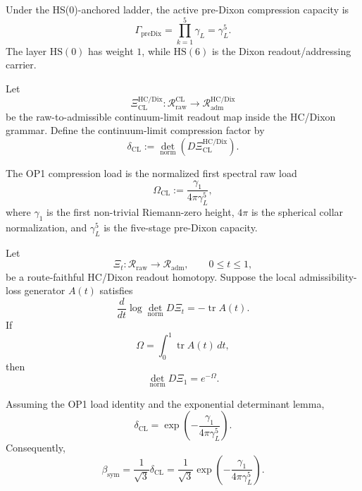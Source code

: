 \begin{lemma}
Under the HS(0)-anchored ladder, the active pre-Dixon compression capacity is
\[
  \Gamma_{\mathrm{preDix}}
  =
  \prod_{k=1}^{5}\gamma_L
  =
  \gamma_L^5.
\]
The layer \(\mathrm{HS}(0)\) has weight \(1\), while \(\mathrm{HS}(6)\) is the Dixon readout/addressing carrier.
\end{lemma}

\begin{definition}
Let
\[
  \Xi_{\mathrm{CL}}^{\mathrm{HC/Dix}}
  :
  \mathcal R_{\mathrm{raw}}^{\mathrm{CL}}
  \longrightarrow
  \mathcal R_{\mathrm{adm}}^{\mathrm{HC/Dix}}
\]
be the raw-to-admissible continuum-limit readout map inside the HC/Dixon grammar.  Define the continuum-limit compression factor by
\[
  \delta_{\mathrm{CL}}
  :=
  \det_{\mathrm{norm}}
  \left(
    D\Xi_{\mathrm{CL}}^{\mathrm{HC/Dix}}
  \right).
\]
\end{definition}

\begin{definition}
The OP1 compression load is the normalized first spectral raw load
\[
  \Omega_{\mathrm{CL}}
  :=
  \frac{\gamma_1}{4\pi\gamma_L^5},
\]
where \(\gamma_1\) is the first non-trivial Riemann-zero height, \(4\pi\) is the spherical collar normalization, and \(\gamma_L^5\) is the five-stage pre-Dixon capacity.
\end{definition}

\begin{lemma}
Let
\[
  \Xi_t:\mathcal R_{\mathrm{raw}}\to \mathcal R_{\mathrm{adm}},
  \qquad 0\le t\le 1,
\]
be a route-faithful HC/Dixon readout homotopy.  Suppose the local admissibility-loss generator \(A(t)\) satisfies
\[
  \frac{d}{dt}
  \log
  \det_{\mathrm{norm}}D\Xi_t
  =
  -\operatorname{tr}A(t).
\]
If
\[
  \Omega
  =
  \int_0^1 \operatorname{tr}A(t)\,dt,
\]
then
\[
  \det_{\mathrm{norm}}D\Xi_1
  =
  e^{-\Omega}.
\]
\end{lemma}

\begin{corollary}
Assuming the OP1 load identity and the exponential determinant lemma,
\[
  \delta_{\mathrm{CL}}
  =
  \exp\left(
    -\frac{\gamma_1}{4\pi\gamma_L^5}
  \right).
\]
Consequently,
\[
  \beta_{\mathrm{sym}}
  =
  \frac{1}{\sqrt3}\delta_{\mathrm{CL}}
  =
  \frac{1}{\sqrt3}
  \exp\left(
    -\frac{\gamma_1}{4\pi\gamma_L^5}
  \right).
\]
\end{corollary}

